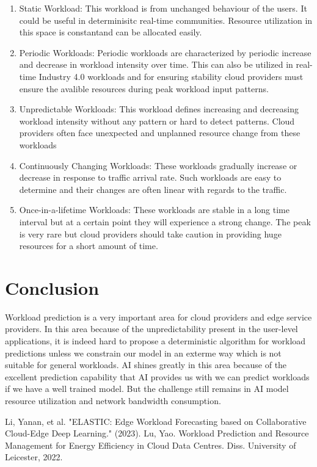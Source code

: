 \documentclass[a4paper, 11pt]{article}
\theoremstyle{nonumberplain}
\begin{document}
\begin{enumerate}
    \item Static Workload: This workload is from unchanged behaviour of the
        users. It could be useful in determinisitc real-time communities.
        Resource utilization in this space is constantand can be allocated
        easily.
    \item Periodic Workloads: Periodic workloads are characterized by periodic
        increase and decrease in workload intensity over time. This can also
        be utilized in real-time Industry 4.0 workloads and for ensuring
        stability cloud providers must ensure the avalible resources during
        peak workload input patterns.
    \item Unpredictable Workloads: This workload defines increasing and
        decreasing workload intensity without any pattern or hard to detect
        patterns. Cloud providers often face unexpected and unplanned
        resource change from these workloads
    \item Continuously Changing Workloads: These workloads gradually increase
        or decrease in response to traffic arrival rate. Such workloads are
        easy to determine and their changes are often linear with regards to the
        traffic.
    \item Once-in-a-lifetime Workloads: These workloads are stable in a long
        time interval but at a certain point they will experience a strong
        change. The peak is very rare but cloud providers should take caution
        in providing huge resources for a short amount of time.
\end{enumerate}

\section{Conclusion}
Workload prediction is a very important area for cloud providers and edge
service providers. In this area because of the unpredictability present
in the user-level applications, it is indeed hard to propose a deterministic
algorithm for workload predictions unless we constrain our model in an
exterme way which is not suitable for general workloads. AI shines greatly in
this area because of the excellent prediction capability that AI provides us
with we can predict workloads if we have a well trained model. But the
challenge still remains in AI model resource utilization and network
bandwidth consumption.


% 

\begin{thebibliography}{1}
     Li, Yanan, et al.
        "ELASTIC: Edge Workload Forecasting based on
        Collaborative Cloud-Edge Deep Learning." (2023).
     Lu, Yao. Workload Prediction and Resource Management
        for Energy Efficiency in Cloud Data Centres. Diss.
        University of Leicester, 2022.
\end{thebibliography}
\end{document}
